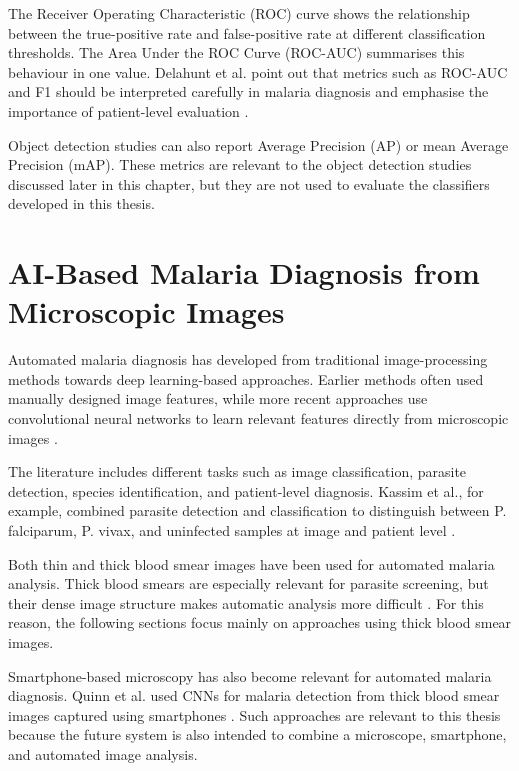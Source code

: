 The Receiver Operating Characteristic (ROC) curve shows the relationship between the true-positive rate and false-positive rate at different classification thresholds. The Area Under the ROC Curve (ROC-AUC) summarises this behaviour in one value. Delahunt et al. point out that metrics such as ROC-AUC and F1 should be interpreted carefully in malaria diagnosis and emphasise the importance of patient-level evaluation \cite{Delahunt2024}.

Object detection studies can also report Average Precision (AP) or mean Average Precision (mAP). These metrics are relevant to the object detection studies discussed later in this chapter, but they are not used to evaluate the classifiers developed in this thesis.

\section{AI-Based Malaria Diagnosis from Microscopic Images}
\label{sec:ai_malaria_diagnosis}

Automated malaria diagnosis has developed from traditional image-processing methods towards deep learning-based approaches. Earlier methods often used manually designed image features, while more recent approaches use convolutional neural networks to learn relevant features directly from microscopic images \cite{Maturana2022,Quinn2016}.

The literature includes different tasks such as image classification, parasite detection, species identification, and patient-level diagnosis. Kassim et al., for example, combined parasite detection and classification to distinguish between P. falciparum, P. vivax, and uninfected samples at image and patient level \cite{Kassim2021}.

Both thin and thick blood smear images have been used for automated malaria analysis. Thick blood smears are especially relevant for parasite screening, but their dense image structure makes automatic analysis more difficult \cite{Maturana2022}. For this reason, the following sections focus mainly on approaches using thick blood smear images.

Smartphone-based microscopy has also become relevant for automated malaria diagnosis. Quinn et al. used CNNs for malaria detection from thick blood smear images captured using smartphones \cite{Quinn2016}. Such approaches are relevant to this thesis because the future system is also intended to combine a microscope, smartphone, and automated image analysis.

